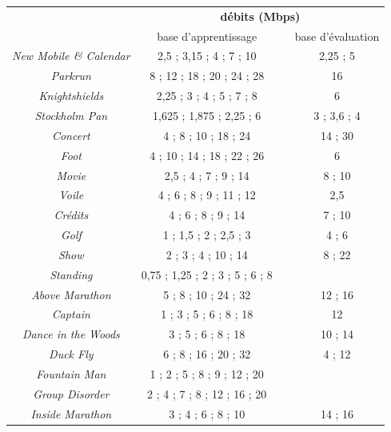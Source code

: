\begin{table}[htbp]
\centering
\begin{tabular}{>{\itshape}ccp{.5cm}c}\toprule
\multirow{2}{2.5cm}{\textbf{\emph{contenu}}}					& \multicolumn{3}{c}{\textbf{débits (Mbps)}} \\ \cmidrule(r){2-4}%
											& base d'apprentissage & & base d'évaluation 									\\ \toprule
New Mobile \& Calendar		& 2,5 ; 3,15 ; 4 ; 7 ; 10 						& & 2,25 ; 5 							\\ \midrule
Parkrun								& 8 ; 12 ; 18 ; 20 ; 24 ; 28				 	& & 16 									\\ \midrule
Knightshields						& 2,25 ; 3 ; 4 ; 5 ; 7 ; 8 						& & 6 										\\ \midrule
Stockholm Pan						& 1,625 ; 1,875 ; 2,25 ; 6 					& & 3 ; 3,6 ; 4 							\\ \midrule
Concert								& 4 ; 8 ; 10 ; 18 ; 24								& & 14 ; 30 								\\ \midrule
Foot										& 4 ; 10 ; 14 ; 18 ; 22 ; 26 					& & 6 										\\ \midrule
Movie									& 2,5 ; 4 ; 7 ; 9 ; 14 								& & 8 ; 10								\\ \midrule
Voile										& 4 ; 6 ; 8 ; 9 ; 11 ; 12 							& & 2,5									\\ \midrule
Crédits									& 4 ; 6 ; 8 ; 9 ; 14 								& & 7 ; 10								\\ \midrule
Golf										& 1 ; 1,5 ; 2 ; 2,5 ; 3			 					& & 4 ; 6									\\ \midrule
Show									& 2 ; 3 ; 4 ; 10 ; 14 								& & 8 ; 22								\\ \midrule
Standing								& 0,75 ; 1,25 ; 2 ; 3 ; 5 ; 6 ; 8 																\\ \midrule
Above Marathon					& 5 ; 8 ; 10 ; 24 ; 32 							& & 12 ; 16								\\ \midrule
Captain								& 1 ; 3 ; 5 ; 6 ; 8 ; 18 							& & 12										\\ \midrule
Dance in the Woods				& 3 ; 5 ; 6 ; 8 ; 18 								& & 10 ; 14								\\ \midrule
Duck Fly								& 6 ; 8 ; 16 ; 20 ; 32 							& & 4 ; 12								\\ \midrule
Fountain Man						& 1 ; 2 ; 5 ; 8 ; 9 ; 12 ; 20 																	\\ \midrule
Group Disorder						& 2 ; 4 ; 7 ; 8 ; 12 ; 16 ; 20 																	\\ \midrule
Inside Marathon					& 3 ; 4 ; 6 ; 8 ; 10				 					& & 14 ; 16								\\ \midrule

\end{tabular}
\end{table}
